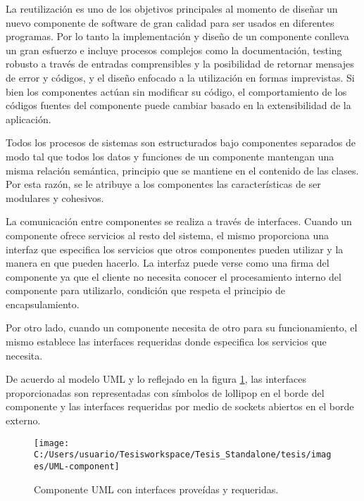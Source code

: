 La reutilización es uno de los objetivos principales al momento de
diseñar un nuevo componente de software de gran calidad para ser usados
en diferentes programas. Por lo tanto la implementación y diseño de
un componente conlleva un gran esfuerzo e incluye procesos complejos
como la documentación, testing robusto a través de entradas comprensibles
y la posibilidad de retornar mensajes de error y códigos, y el diseño
enfocado a la utilización en formas imprevistas. Si bien los componentes
actúan sin modificar su código, el comportamiento de los códigos fuentes
del componente puede cambiar basado en la extensibilidad de la aplicación. 

Todos los procesos de sistemas son estructurados bajo componentes
separados de modo tal que todos los datos y funciones de un componente
mantengan una misma relación semántica, principio que se mantiene
en el contenido de las clases. Por esta razón, se le atribuye a los
componentes las características de ser modulares y cohesivos. 

La comunicación entre componentes se realiza a través de interfaces.
Cuando un componente ofrece servicios al resto del sistema, el mismo
proporciona una interfaz que especifica los servicios que otros componentes
pueden utilizar y la manera en que pueden hacerlo. La interfaz puede
verse como una firma del componente ya que el cliente no necesita
conocer el procesamiento interno del componente para utilizarlo, condición
que respeta el principio de encapsulamiento. 

Por otro lado, cuando un componente necesita de otro para su funcionamiento,
el mismo establece las interfaces requeridas donde especifica los
servicios que necesita. 

De acuerdo al modelo \ac{UML} y lo reflejado en la figura \ref{fig:UML-component},
las interfaces proporcionadas son representadas con símbolos de lollipop
en el borde del componente y las interfaces requeridas por medio de
sockets abiertos en el borde externo. 

\begin{figure}
\begin{centering}
\texttt{[image: C:/Users/usuario/Tesisworkspace/Tesis\_Standalone/tesis/images/UML-component]}
\par\end{centering}

\caption{Componente UML con interfaces proveídas y requeridas.\label{fig:UML-component}}
\end{figure}


